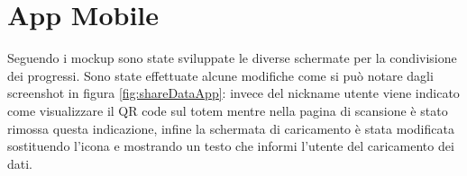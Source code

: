 \section{App Mobile}
Seguendo i mockup sono state sviluppate le diverse schermate per la condivisione dei progressi. Sono state effettuate alcune modifiche come si può notare dagli screenshot in figura \ref{fig:shareDataApp}: invece del nickname utente viene indicato come visualizzare il QR code sul totem mentre nella pagina di scansione è stato rimossa questa indicazione, infine la schermata di caricamento è stata modificata sostituendo l'icona e mostrando un testo che informi l'utente del caricamento dei dati.
\begin{figure}[h!]
    \centering
\end{figure}

